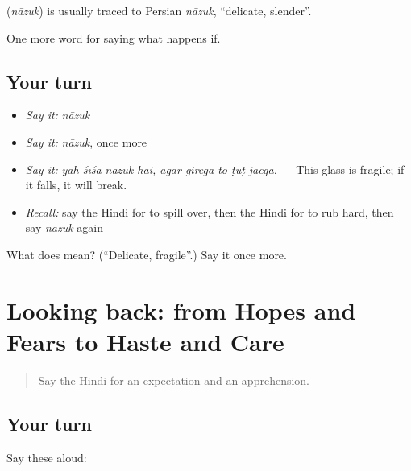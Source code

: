 \begin{cousinweb}
\textbf{} (\emph{nāzuk}) is usually traced to Persian \emph{nāzuk}, \textquotedblleft{}delicate, slender\textquotedblright{}.
\end{cousinweb}

\begin{grammarlens}[title={What you've built}]
One more word for saying what happens if.
\end{grammarlens}

\subsection*{Your turn}
\begin{itemize}
\raggedright
  \item \emph{Say it:} \emph{nāzuk}
  \item \emph{Say it:} \emph{nāzuk}, once more
  \item \emph{Say it:} \emph{yah śīśā nāzuk hai, agar giregā to ṭūṭ jāegā.} — This glass is fragile; if it falls, it will break.
  \item \emph{Recall:} say the Hindi for to spill over, then the Hindi for to rub hard, then say \emph{nāzuk} again
\end{itemize}

\begin{tcolorbox}[breakable,colback=teal!4,colframe=teal!35!black,title={Before you move on}]
What does  mean? (\textquotedblleft{}Delicate, fragile\textquotedblright{}.) Say it once more.
\end{tcolorbox}
\section[(dialogue)]{Looking back: from Hopes and Fears to Haste and Care}

\label{lesson:HI-R382-review-375-382}



\begin{quote}
Say the Hindi for an expectation and an apprehension.
\end{quote}

\subsection*{Your turn}
Say these aloud:

